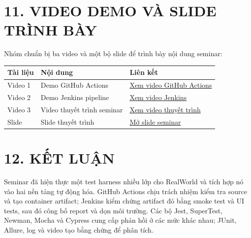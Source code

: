 \documentclass[
  vietnamese,
  12pt,
  a4paper,
  oneside]{report}
\begin{document}
\chapter{11. VIDEO DEMO VÀ SLIDE TRÌNH
BÀY}\label{11-video-demo-vuxe0-slide-truxecnh-buxe0y}

Nhóm chuẩn bị ba video và một bộ slide để trình bày nội dung seminar:

\begin{longtable}[]{@{}
  >{\raggedleft\arraybackslash}p{}
  >{\raggedright\arraybackslash}p{}
  >{\raggedright\arraybackslash}p{}@{}}
\toprule\noalign{}
\begin{minipage}[b]{\linewidth}\raggedleft
Tài liệu
\end{minipage} & \begin{minipage}[b]{\linewidth}\raggedright
Nội dung
\end{minipage} & \begin{minipage}[b]{\linewidth}\raggedright
Liên kết
\end{minipage} \\
\midrule\noalign{}
\endhead
\bottomrule\noalign{}
\endlastfoot
Video 1 & Demo GitHub Actions &
\href{https://drive.google.com/file/d/1OO2DmSEiVwyk-Jcb2RpwqcTHhs9janmp/view?usp=sharing}{Xem
video GitHub Actions} \\
Video 2 & Demo Jenkins pipeline &
\href{https://drive.google.com/drive/folders/1sEgVaQWbD3vBH5v1CqjRAnmRobgyLsJD?usp=sharing}{Xem
video Jenkins} \\
Video 3 & Video thuyết trình seminar &
\href{https://drive.google.com/file/d/13pjwDisbNMdks_shLDick7uwYZ4-8C1q/view?usp=sharing}{Xem
video thuyết trình} \\
Slide & Slide thuyết trình &
\href{../slideshows/theory_presentation.html}{Mở slide seminar} \\
\end{longtable}

\chapter{12. KẾT LUẬN}\label{12-kux1ebft-luux1eadn}

Seminar đã hiện thực một test harness nhiều lớp cho RealWorld và tích
hợp nó vào hai nền tảng tự động hóa. GitHub Actions chịu trách nhiệm
kiểm tra source và tạo container artifact; Jenkins kiểm chứng artifact
đó bằng smoke test và UI tests, sau đó công bố report và dọn môi trường.
Các bộ Jest, SuperTest, Newman, Mocha và Cypress cung cấp phản hồi ở các
mức khác nhau; JUnit, Allure, log và video tạo bằng chứng để phân tích.
\end{document}
